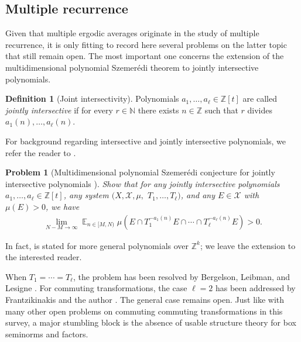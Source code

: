 \documentclass[11pt]{amsart}
\newtheorem{problem}{Problem}
\theoremstyle{definition}
\newtheorem{definition}[lemma]{Definition}
\DeclareMathOperator*{\E}{\mathbb{E}}
\newcommand{\N}{{\mathbb N}}
\newcommand{\Z}{{\mathbb Z}}
\newcommand{\CX}{{\mathcal X}}
\newcommand{\1}{{\mathbf{1}}}
\begin{document}
\subsection{Multiple recurrence}
Given that multiple ergodic averages originate in the study of multiple recurrence, it is only fitting to record here several problems on the latter topic that still remain open. The most important one concerns the extension of the multidimensional polynomial Szemer\'edi theorem to jointly intersective polynomials.
\begin{definition}[Joint intersectivity]
    Polynomials $a_1, \ldots, a_\ell\in\Z[t]$ are called \emph{jointly intersective} if for every $r\in\N$ there exists $n\in\Z$ such that $r$ divides $a_1(n), \ldots, a_\ell(n)$.
\end{definition}
For background regarding intersective and jointly intersective polynomials, we refer the reader to \cite{BLL08}. %
\begin{problem}[Multidimensional polynomial Szemer\'edi conjecture for jointly intersective polynomials {\cite[Conjecture 6.3]{BLL08}}]\label{Pr: joint intersective}
    Show that for any jointly intersective polynomials $a_1, \ldots, a_\ell\in\Z[t]$, any system $(X, \CX, \mu,$\! $T_1, \ldots, T_\ell)$, and any $E\in\CX$ with $\mu(E)>0$, we have
    \begin{align*}
       \lim_{N-M\to\infty}\E_{n\in [M,N)}\mu(E\cap T_1^{-a_1(n)}E\cap \cdots \cap T_\ell^{-a_\ell(n)}E)>0.
    \end{align*}
\end{problem}
In fact, {\cite[Conjecture 6.3]{BLL08}} is stated for more general polynomials over $\Z^k$; we leave the extension to the interested reader.

When $T_1 = \cdots = T_\ell$, the problem has been resolved by Bergelson, Leibman, and Lesigne \cite[Theorem 1.1]{BLL08}. For commuting transformations, the case $\ell=2$ has been addressed by Frantzikinakis and the author \cite[Theorem 1.3]{FrKu25}. The general case remains open. Just like with many other open problems on commuting commuting transformations in this survey, a major stumbling block is the absence of usable structure theory for box seminorms and factors.
\end{document}
